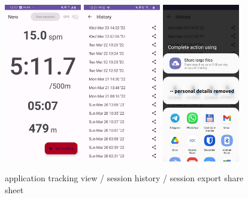 \documentclass[11pt,twoside,a4paper]{report}
\begin{document}
\begin{figure}[h!]
  \centering
  \includegraphics[width=0.3\textwidth]{appworking.jpg}
  \includegraphics[width=0.3\textwidth]{viewsessions.jpg}
  \includegraphics[width=0.3\textwidth]{sharesheet.jpg}
  \caption{application tracking view / session history / session export share sheet}
  \label{fig:appscreenshotworking}
\end{figure}
\end{document}
